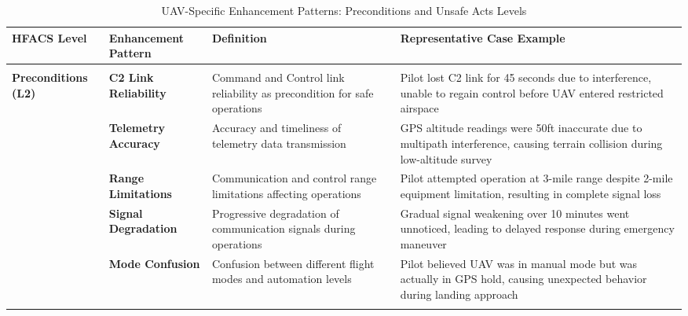 \begin{table*}[!htbp]
\centering
\caption{UAV-Specific Enhancement Patterns: Preconditions and Unsafe Acts Levels}
\label{tab:uav_enhancement_patterns_part2}
\begin{adjustbox}{width=\textwidth,center}
\begin{threeparttable}
\footnotesize
\begin{tabular}{@{}p{2.0cm}p{3.5cm}p{5.0cm}p{4.5cm}@{}}
\toprule
\textbf{HFACS Level} & \textbf{Enhancement Pattern} & \textbf{Definition} & \textbf{Representative Case Example} \\
\midrule

\rowcolor{orange!10}
\multicolumn{4}{c}{\textbf{Level 2: Preconditions for Unsafe Acts (11 patterns)}} \\
\midrule

\textbf{Preconditions (L2)}
& \textbf{C2 Link Reliability}
& Command and Control link reliability as precondition for safe operations
& Pilot lost C2 link for 45 seconds due to interference, unable to regain control before UAV entered restricted airspace \\
\addlinespace[0.2ex]

& \textbf{Telemetry Accuracy}
& Accuracy and timeliness of telemetry data transmission
& GPS altitude readings were 50ft inaccurate due to multipath interference, causing terrain collision during low-altitude survey \\
\addlinespace[0.2ex]

& \textbf{Range Limitations}
& Communication and control range limitations affecting operations
& Pilot attempted operation at 3-mile range despite 2-mile equipment limitation, resulting in complete signal loss \\
\addlinespace[0.2ex]

& \textbf{Signal Degradation}
& Progressive degradation of communication signals during operations
& Gradual signal weakening over 10 minutes went unnoticed, leading to delayed response during emergency maneuver \\
\addlinespace[0.2ex]

& \textbf{Mode Confusion}
& Confusion between different flight modes and automation levels
& Pilot believed UAV was in manual mode but was actually in GPS hold, causing unexpected behavior during landing approach \\
\addlinespace[0.2ex]


\end{tabular}
\end{threeparttable}
\end{adjustbox}
\end{table*}
